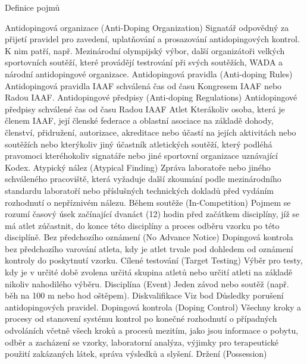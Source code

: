 \nonum\sec Definice pojmů

\dt Antidopingová organizace (Anti-Doping Organization)
\dd Signatář odpovědný za přijetí pravidel pro zavedení, uplatňování a prosazování antidopingových kontrol. K nim patří, např. Mezinárodní olympijský výbor, další organizátoři velkých sportovních soutěží, které provádějí testrování při svých soutěžích, WADA a národní antidopingové organizace.
\dend
\dt Antidopingová pravidla (Anti-doping Rules)
\dd Antidopingová pravidla IAAF schválená čas od času Kongresem IAAF nebo Radou IAAF.
\dend
\dt Antidopingové předpisy (Anti-doping Regulations)
\dd Antidopingové předpisy schválené čas od času Radou IAAF
\dend
\dt Atlet
\dd Kterákoliv osoba, která je členem IAAF, její členské federace a oblastní asociace na základě dohody, členství, přidružení, autorizace, akreditace nebo účastí na jejích aktivitách nebo soutěžích nebo kterýkoliv jiný účastník atletických soutěží, který podléhá pravomoci kteréhokoliv signatáře nebo jiné sportovní organizace uznávající Kodex.
\dend
\dt Atypický nález (Atypical Finding)
\dd Zpráva laboratoře nebo jiného schváleného pracoviště, která vyžaduje další zkoumání podle mezinárodního standardu laboratoří nebo příslušných technických dokladů před vydáním rozhodnutí o nepříznivém nálezu.
\dend
\dt Během soutěže (In-Competition)
\dd Pojmem  se rozumí časový úsek začínající dvanáct (12) hodin před začátkem disciplíny, jíž se má atlet zúčastnit, do konce této disciplíny a proces odběru vzorku po této disciplíně.
\dend
\dt Bez předchozího oznámení (No Advance Notice)
\dd Dopingová kontrola bez předchozího varování atleta, kdy je atlet trvale pod dohledem od oznámení kontroly do poskytnutí vzorku.
\dend
\dt Cílené testování (Target Testing)
\dd Výběr pro testy, kdy je v určité době zvolena určitá skupina atletů nebo určití atleti na základě nikoliv nahodilého výběru.
\dend
\dt Disciplína (Event)
\dd Jeden závod nebo soutěž (např. běh na 100 m nebo hod oštěpem).
\dend
\dt Diskvalifikace
\dd Viz bod Důsledky porušení antidopingových pravidel.
\dend
\dt Dopingová kontrola (Doping Control)
\dd Všechny kroky a procesy od stanovení systému kontrol po konečné rozhodnutí o případných odvoláních včetně všech kroků a procesů mezitím, jako jsou informace o pobytu, odběr a zacházení se vzorky, laboratorní analýza, výjimky pro terapeutické použití zakázaných látek, správa výsledků a slyšení.
\dend
\dt Držení (Possession)
